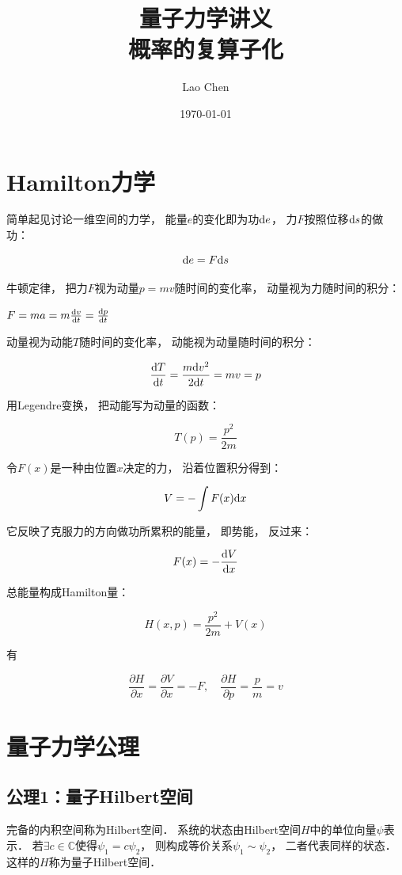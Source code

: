 \documentclass[10pt, openany]{book}
\begin{document}
\frontmatter
\title{\textbf{量子力学讲义}\\ \large 概率的复算子化}
\author{Lao Chen}
\date{\today}
\maketitle
\tableofcontents

\mainmatter

\chapter{Hamilton力学}

简单起见讨论一维空间的力学，
能量$e$的变化即为功$\text d e$，
力$F$按照位移$\text d s$的做功：

$$
\text d e = F \text d s
$$

牛顿定律，
把力$F$视为动量$p=mv$随时间的变化率，
动量视为力随时间的积分：

$
F = ma
= m\frac{\text dv}{\text dt}
= \frac{\text dp}{\text dt}
$

动量视为动能$T$随时间的变化率，
动能视为动量随时间的积分：

$$
\frac{\text dT}{\text dt}
=\frac{m\text d v^2}{2 \text dt}
=mv = p
$$

用Legendre变换，
把动能写为动量的函数：

$$
T(p) = \frac{p^2}{2m}
$$

令$F(x)$是一种由位置$x$决定的力，
沿着位置积分得到：

$$
V = -\int F(x) \text d x
$$

它反映了克服力的方向做功所累积的能量，
即势能，
反过来：

$$
F(x) = -\frac{\text d V}{\text d x}
$$

总能量构成Hamilton量：

$$
H(x,p) = \frac{p^2}{2m} + V(x)
$$

有

$$
\frac{\partial H}{\partial x}
=\frac{\partial V}{\partial x}
= -F, \quad 
\frac{\partial H}{\partial p}
=\frac{p}{m}
= v
$$

\chapter{量子力学公理}

\section{公理1：量子Hilbert空间}

完备的内积空间称为Hilbert空间．
系统的状态由Hilbert空间$H$中的单位向量$\psi$表示．
若$\exists c\in\mathbb C$使得$\psi_1 = c\psi_2$，
则构成等价关系$\psi_1 \sim \psi_2$，
二者代表同样的状态．
这样的$H$称为量子Hilbert空间．
\end{document}
